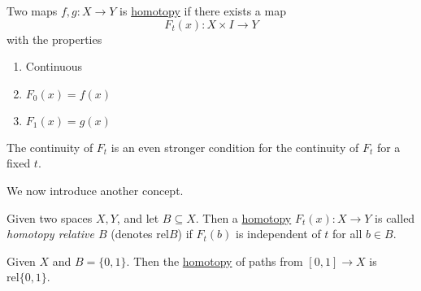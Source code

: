 \begin{prev}
	Two maps \(f, g\colon X\to Y\) is \hyperref[def:homotopy]{homotopy} if there exists a map
	\[
		F_t(x)\colon X\times I\to Y
	\]
	with the properties
	\begin{enumerate}
		\item Continuous
		\item \(F_0(x) = f(x)\)
		\item \(F_1(x) = g(x)\)
	\end{enumerate}
	\begin{remark}
		The continuity of \(F_t\) is an even stronger condition for the continuity of \(F_t\) for a fixed \(t\).
	\end{remark}
\end{prev}

We now introduce another concept.
\begin{definition}\label{def:homotopy-relative}
	Given two spaces \(X, Y\), and let \(B\subseteq X\). Then a \hyperref[def:homotopy]{homotopy} \(F_t(x)\colon X\to Y\) is called
	\emph{homotopy relative \(B\)} (denotes \(\mathrm{rel} B\)) if \(F_t(b)\) is independent of \(t\) for all \(b\in B\).
\end{definition}

\begin{eg}
	Given \(X\) and \(B = \{0, 1\}\). Then the \hyperref[def:homotopy]{homotopy} of paths from \([0, 1]\to X\) is
	\(\mathrm{rel} \{0, 1\}\).
	\begin{figure}[H]
		\centering
		\label{fig:eg:rel-homotopy}
	\end{figure}
\end{eg}

